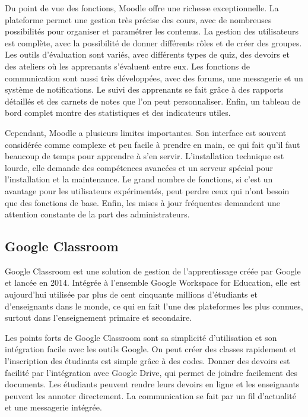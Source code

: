\documentclass[12pt,a4paper]{report}
\begin{document}
Du point de vue des fonctions, Moodle offre une richesse exceptionnelle. La plateforme permet une gestion très précise des cours, avec de nombreuses possibilités pour organiser et paramétrer les contenus. La gestion des utilisateurs est complète, avec la possibilité de donner différents rôles et de créer des groupes. Les outils d'évaluation sont variés, avec différents types de quiz, des devoirs et des ateliers où les apprenants s'évaluent entre eux. Les fonctions de communication sont aussi très développées, avec des forums, une messagerie et un système de notifications. Le suivi des apprenants se fait grâce à des rapports détaillés et des carnets de notes que l'on peut personnaliser. Enfin, un tableau de bord complet montre des statistiques et des indicateurs utiles.

Cependant, Moodle a plusieurs limites importantes. Son interface est souvent considérée comme complexe et peu facile à prendre en main, ce qui fait qu'il faut beaucoup de temps pour apprendre à s'en servir. L'installation technique est lourde, elle demande des compétences avancées et un serveur spécial pour l'installation et la maintenance. Le grand nombre de fonctions, si c'est un avantage pour les utilisateurs expérimentés, peut perdre ceux qui n'ont besoin que des fonctions de base. Enfin, les mises à jour fréquentes demandent une attention constante de la part des administrateurs.

\subsection{Google Classroom}
Google Classroom est une solution de gestion de l'apprentissage créée par Google et lancée en 2014. Intégrée à l'ensemble Google Workspace for Education, elle est aujourd'hui utilisée par plus de cent cinquante millions d'étudiants et d'enseignants dans le monde, ce qui en fait l'une des plateformes les plus connues, surtout dans l'enseignement primaire et secondaire.

Les points forts de Google Classroom sont sa simplicité d'utilisation et son intégration facile avec les outils Google. On peut créer des classes rapidement et l'inscription des étudiants est simple grâce à des codes. Donner des devoirs est facilité par l'intégration avec Google Drive, qui permet de joindre facilement des documents. Les étudiants peuvent rendre leurs devoirs en ligne et les enseignants peuvent les annoter directement. La communication se fait par un fil d'actualité et une messagerie intégrée.
\end{document}
